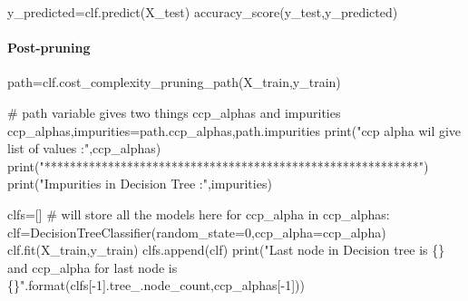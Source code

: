 \documentclass[
  letterpaper,
  DIV=11,
  numbers=noendperiod]{scrartcl}
\let\oldparagraph\paragraph
\renewcommand{\paragraph}[1]{\oldparagraph{#1}\mbox{}}
\newenvironment{Shaded}{\begin{snugshade}}{\end{snugshade}}
\newcommand{\BuiltInTok}[1]{\textcolor[rgb]{0.00,0.23,0.31}{#1}}
\newcommand{\CommentTok}[1]{\textcolor[rgb]{0.37,0.37,0.37}{#1}}
\newcommand{\ControlFlowTok}[1]{\textcolor[rgb]{0.00,0.23,0.31}{#1}}
\newcommand{\DecValTok}[1]{\textcolor[rgb]{0.68,0.00,0.00}{#1}}
\newcommand{\KeywordTok}[1]{\textcolor[rgb]{0.00,0.23,0.31}{#1}}
\newcommand{\NormalTok}[1]{\textcolor[rgb]{0.00,0.23,0.31}{#1}}
\newcommand{\OperatorTok}[1]{\textcolor[rgb]{0.37,0.37,0.37}{#1}}
\newcommand{\SpecialCharTok}[1]{\textcolor[rgb]{0.37,0.37,0.37}{#1}}
\newcommand{\StringTok}[1]{\textcolor[rgb]{0.13,0.47,0.30}{#1}}
\begin{document}
\begin{Shaded}
\begin{Highlighting}[]
\NormalTok{y\_predicted}\OperatorTok{=}\NormalTok{clf.predict(X\_test)}
\NormalTok{accuracy\_score(y\_test,y\_predicted)}
\end{Highlighting}
\end{Shaded}

\paragraph{Post-pruning}\label{post-pruning}

\begin{Shaded}
\begin{Highlighting}[]
\NormalTok{path}\OperatorTok{=}\NormalTok{clf.cost\_complexity\_pruning\_path(X\_train,y\_train)}

\CommentTok{\# path variable gives two things ccp\_alphas and impurities}
\NormalTok{ccp\_alphas,impurities}\OperatorTok{=}\NormalTok{path.ccp\_alphas,path.impurities}
\BuiltInTok{print}\NormalTok{(}\StringTok{"ccp alpha wil give list of values :"}\NormalTok{,ccp\_alphas)}
\BuiltInTok{print}\NormalTok{(}\StringTok{"***********************************************************"}\NormalTok{)}
\BuiltInTok{print}\NormalTok{(}\StringTok{"Impurities in Decision Tree :"}\NormalTok{,impurities)}
\end{Highlighting}
\end{Shaded}

\begin{Shaded}
\begin{Highlighting}[]
\NormalTok{clfs}\OperatorTok{=}\NormalTok{[]   }\CommentTok{\# will store all the models here}
\ControlFlowTok{for}\NormalTok{ ccp\_alpha }\KeywordTok{in}\NormalTok{ ccp\_alphas:}
\NormalTok{    clf}\OperatorTok{=}\NormalTok{DecisionTreeClassifier(random\_state}\OperatorTok{=}\DecValTok{0}\NormalTok{,ccp\_alpha}\OperatorTok{=}\NormalTok{ccp\_alpha)}
\NormalTok{    clf.fit(X\_train,y\_train)}
\NormalTok{    clfs.append(clf)}
\BuiltInTok{print}\NormalTok{(}\StringTok{"Last node in Decision tree is }\SpecialCharTok{\{\}}\StringTok{ and ccp\_alpha for last node is }\SpecialCharTok{\{\}}\StringTok{"}\NormalTok{.}\BuiltInTok{format}\NormalTok{(clfs[}\OperatorTok{{-}}\DecValTok{1}\NormalTok{].tree\_.node\_count,ccp\_alphas[}\OperatorTok{{-}}\DecValTok{1}\NormalTok{]))}
\end{Highlighting}
\end{Shaded}
\end{document}
